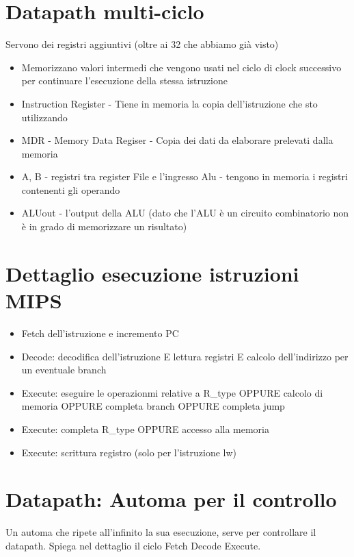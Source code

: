 \documentclass[12pt, a4paper, openany]{book}
\begin{document}
\section{Datapath multi-ciclo}
Servono dei registri aggiuntivi (oltre ai 32 che abbiamo già visto)
\begin{itemize}
    \item Memorizzano valori intermedi che vengono usati nel ciclo di clock successivo
    per continuare l'esecuzione della stessa istruzione
    \item Instruction Register - Tiene in memoria la copia dell'istruzione che sto utilizzando
    \item MDR - Memory Data Regiser - Copia dei dati da elaborare prelevati dalla memoria 
    \item A, B - registri tra register File e l'ingresso Alu - tengono in memoria i registri contenenti gli operando
    \item ALUout - l'output della ALU (dato che l'ALU è un circuito combinatorio non è in 
    grado di memorizzare un risultato)
\end{itemize}

\section{Dettaglio esecuzione istruzioni MIPS}
\begin{itemize}
    \item Fetch dell'istruzione e incremento PC
    \item Decode: decodifica dell'istruzione E lettura registri E calcolo
    dell'indirizzo per un eventuale branch
    \item Execute: eseguire le operazionmi relative a R\_type OPPURE calcolo di memoria
    OPPURE completa branch OPPURE completa jump
    \item Execute: completa R\_type OPPURE accesso alla memoria
    \item Execute: scrittura registro (solo per l'istruzione lw)
\end{itemize}

\section{Datapath: Automa per il controllo}
Un automa che ripete all'infinito la sua esecuzione, serve per controllare il datapath.
Spiega nel dettaglio il ciclo Fetch Decode Execute. 
\end{document}

